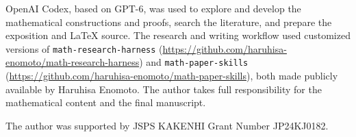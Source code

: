\begin{useofai}
OpenAI Codex,
based on GPT-6,
was used to explore and develop the mathematical constructions and proofs,
search the literature,
and prepare the exposition and \LaTeX{} source.
The research and writing workflow used customized versions of
\texttt{math-research-harness}
(\url{https://github.com/haruhisa-enomoto/math-research-harness})
and
\texttt{math-paper-skills}
(\url{https://github.com/haruhisa-enomoto/math-paper-skills}),
both made publicly available by Haruhisa Enomoto.
The author takes full responsibility for the mathematical content and the final
manuscript.
\end{useofai}

\begin{acknowledgements}
The author was supported by JSPS KAKENHI Grant Number JP24KJ0182.
\end{acknowledgements}
